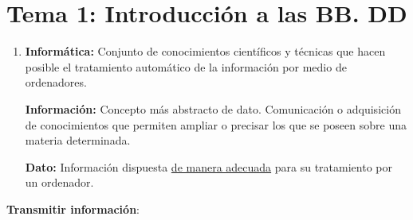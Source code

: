 \documentclass[12pt, twoside, openright]{report} %
\begin{document}






  \chapter{Tema 1: Introducción a las BB. DD}

  \begin{enumerate}
  \item \textbf{Informática:} Conjunto de conocimientos científicos y
    técnicas que hacen posible el tratamiento automático de la
    información por medio de ordenadores.
    

    \textbf{Información:} Concepto más abstracto de dato. Comunicación o
    adquisición de conocimientos que permiten ampliar o precisar los que
    se poseen sobre una materia determinada.
    

    \textbf{Dato:} Información dispuesta \underline{de manera adecuada}
    para su tratamiento por un ordenador.
    
  \end{enumerate}

  \textbf{Transmitir información}:
\end{document}
